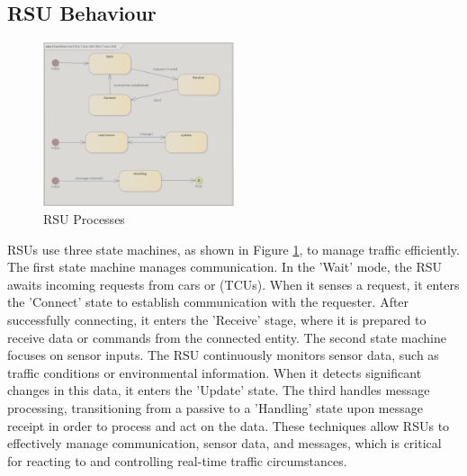  

\subsection{RSU Behaviour}
\label{sec:design_and_implementation}
\begin{figure}[ht]
    \centering
    \includegraphics[width=0.5\textwidth]{images/rsu_state_machine.png}
    \caption{RSU Processes }
    \label{img:rsu_state_machine}
\end{figure}
RSUs use three state machines, as shown in Figure \ref{img:rsu_state_machine}, to manage traffic efficiently.
The first state machine manages communication. In the 'Wait' mode, the RSU awaits incoming requests from cars or (TCUs). When it senses a request, it enters the 'Connect' state to establish communication with the requester. After successfully connecting, it enters the 'Receive' stage, where it is prepared to receive data or commands from the connected entity. The second state machine focuses on sensor inputs. The RSU continuously monitors sensor data, such as traffic conditions or environmental information. When it detects significant changes in this data, it enters the 'Update' state. The third handles message processing, transitioning from a passive to a 'Handling' state upon message receipt in order to process and act on the data. These techniques allow RSUs to effectively manage communication, sensor data, and messages, which is critical for reacting to and controlling real-time traffic circumstances.






